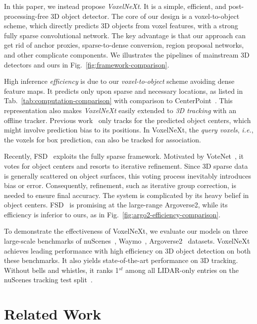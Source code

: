 \documentclass[10pt,twocolumn,letterpaper]{article}
\begin{document}
In this paper, we instead propose {\em VoxelNeXt}. It is a simple, efficient, and post-processing-free 3D object detector. The core of our design is a voxel-to-object scheme, which directly predicts 3D objects from voxel features,  with a strong fully sparse convolutional network.
The key advantage is that our approach can get rid of anchor proxies, sparse-to-dense conversion, region proposal networks, and other complicate components. We illustrates the pipelines of mainstream 3D detectors and ours in Fig.~\ref{fig:framework-comparison}.

High inference {\em efficiency} is due to our {\em voxel-to-object} scheme avoiding dense feature maps. It predicts only upon sparse and necessary locations, as listed in Tab.~\ref{tab:computation-comparison} with comparison to CenterPoint~\cite{centerpoint}.
This representation also makes {\em VoxelNeXt} easily extended to {\em 3D tracking} with an offline tracker. Previous work~\cite{centerpoint} only tracks for the predicted object centers, which might involve prediction bias to its positions. In VoxelNeXt, the {\em query voxels}, {\em i.e.}, the voxels for box prediction, can also be tracked for association.

Recently, FSD~\cite{fsd} exploits the fully sparse framework. Motivated by VoteNet~\cite{votenet}, it votes for object centers and resorts to iterative refinement.
Since 3D sparse data is generally scattered on object surfaces, this voting process inevitably introduces bias or error. Consequently, refinement, such as iterative group correction, is needed to ensure final accuracy. The system is complicated by its heavy belief in object centers. FSD~\cite{fsd} is promising at the large-range Argoverse2, while its efficiency is inferior to ours, as in Fig.~\ref{fig:argo2-efficiency-comparison}.

To demonstrate the effectiveness of {VoxelNeXt}, we evaluate our models on three large-scale benchmarks of nuScenes~\cite{nuscenes}, Waymo~\cite{waymo}, Argoverse2~\cite{argo2} datasets. VoxelNeXt achieves leading performance with high efficiency on 3D object detection on both these benchmarks. It also yields state-of-the-art performance on 3D tracking. Without bells and whistles, it ranks 1$^{st}$ among all LIDAR-only entries on the nuScenes tracking test split~\cite{nuscenes}.



\section{Related Work}
\label{sec:related_work}
\end{document}
